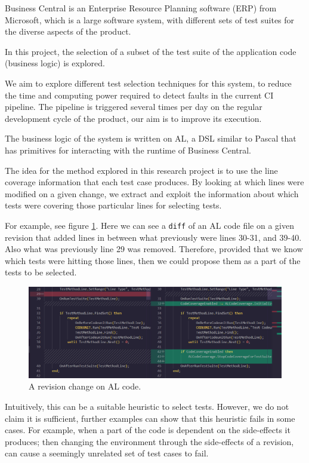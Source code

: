 \documentclass{article}
\begin{document}
   Business Central is an Enterprise Resource Planning software (ERP) from Microsoft, which is a large software system, with different sets of test suites for the diverse aspects of the product.

   In this project, the selection of a subset of the test suite of the application code (business logic) is explored. 

   We aim to explore different test selection techniques for this system, to reduce the time and computing power required to detect faults in the current CI pipeline. The pipeline is triggered several times per day on the regular development cycle of the product, our aim is to improve its execution.

   The business logic of the system is written on AL, a DSL similar to Pascal that has primitives for interacting with the runtime of Business Central.

The idea for the method explored in this research project is to use the line coverage information that each test case produces. By looking at which lines were modified on a given change, we extract and exploit the information about which tests were covering those particular lines for selecting tests.

For example, see figure \ref{fig:diff}. Here we can see a \texttt{diff} of an AL code file on a given revision that added lines in between what previously were lines 30-31, and 39-40. Also what was previously line 29 was removed. Therefore, provided that we know which tests were hitting those lines, then we could propose them as a part of the tests to be selected.

\begin{figure}[H]
  \includegraphics[width=\textwidth]{images/diff.png}
  \caption{A revision change on AL code.}
  \label{fig:diff}
\end{figure}

Intuitively, this can be a suitable heuristic to select tests. However, we do not claim it is sufficient, further examples can show that this heuristic fails in some cases. For example, when a part of the code is dependent on the side-effects it produces; then changing the environment through the side-effects of a revision, can cause a seemingly unrelated set of test cases to fail.
\end{document}
